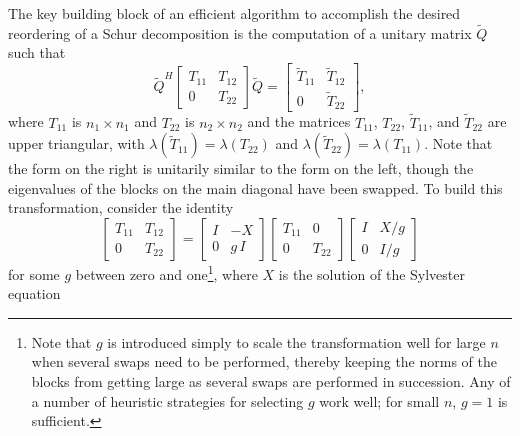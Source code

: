 The key building block of an efficient algorithm to accomplish the desired reordering of a Schur decomposition is the computation of a unitary matrix $\tilde Q$ such that
\begin{equation}
  \tilde Q^H \begin{bmatrix} T_{11} & T_{12} \\  0 & T_{22} \end{bmatrix} \tilde Q = \begin{bmatrix} \tilde T_{11} & \tilde T_{12} \\  0 & \tilde T_{22} \end{bmatrix},
  \label{blockswap}
\end{equation}
where $T_{11}$ is $n_1 \times n_1$ and $T_{22}$ is $n_2 \times n_2$ and the matrices $T_{11}$, $T_{22}$, $\tilde T_{11}$, and $\tilde T_{22}$ are upper triangular,
with $\lambda(\tilde T_{11})=\lambda(T_{22})$ and $\lambda(\tilde T_{22})=\lambda(T_{11})$.  
Note that the form on the right is unitarily similar to the form on
the left, though the eigenvalues of the blocks on the main diagonal have been swapped.
To build this transformation, consider the identity
\begin{equation}
  \begin{bmatrix} T_{11} & T_{12} \\ 0 & T_{22} \end{bmatrix} =
  \begin{bmatrix} I & -X \\ 0 & g\, I \end{bmatrix} \begin{bmatrix} T_{11} & 0 \\ 0 & T_{22} \end{bmatrix} \begin{bmatrix} I & X/g \\ 0 & I/g \end{bmatrix}
    \label{blockswap2}  
\end{equation}
for some $g$ between zero and one\footnote{Note that $g$ is introduced simply to scale the transformation well for large $n$ when several swaps need
to be performed, thereby keeping the norms
of the blocks from getting large as several swaps are performed in succession.  Any of a number of heuristic strategies for selecting $g$ work well;
for small $n$, $g=1$ is sufficient.}, where $X$ is the solution of the Sylvester equation
